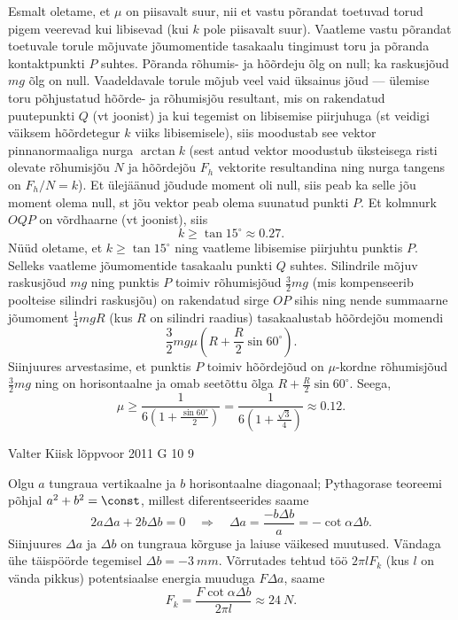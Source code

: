 \documentclass[11pt, twoside]{article}
\begin{document}
{{Esmalt oletame, et $\mu$ on piisavalt suur, nii et vastu põrandat toetuvad torud pigem veerevad kui libisevad (kui $k$ pole piisavalt suur). Vaatleme vastu põrandat toetuvale torule mõjuvate jõumomentide tasakaalu tingimust toru ja põranda kontaktpunkti $P$ suhtes. Põranda rõhumis- ja hõõrdeju õlg on null; ka raskusjõud $mg$ õlg on null. Vaadeldavale torule mõjub veel vaid üksainus jõud --- ülemise toru põhjustatud hõõrde- ja rõhumisjõu resultant, mis on rakendatud puutepunkti $Q$ (vt joonist) ja kui tegemist on libisemise piirjuhuga (st veidigi väiksem hõõrdetegur $k$ viiks libisemisele), siis moodustab see vektor pinnanormaaliga nurga $\arctan k$ (sest antud vektor moodustub üksteisega risti olevate rõhumisjõu $N$ ja hõõrdejõu $F_h$ vektorite resultandina ning nurga tangens on $F_h/N=k$). Et ülejäänud jõudude moment oli null, siis peab ka selle jõu moment olema null,
st jõu vektor peab olema suunatud punkti $P$. Et kolmnurk $OQP$ on võrdhaarne (vt joonist),
siis
\[
k\ge \tan 15^\circ\approx \num{0,27}.
\]
Nüüd oletame, et $k \ge \tan 15^\circ$ ning vaatleme libisemise piirjuhtu punktis $P$. Selleks vaatleme jõumomentide tasakaalu punkti $Q$ suhtes.
Silindrile mõjuv raskusjõud $mg$ ning punktis $P$ toimiv rõhumisjõud $\frac 32 mg$ (mis kompenseerib poolteise silindri raskusjõu) on rakendatud sirge $OP$ sihis ning nende summaarne jõumoment $\frac 14mgR$ (kus $R$ on silindri raadius) tasakaalustab hõõrdejõu momendi 
\[
\frac 32 mg\mu (R+\frac R2\sin 60^\circ).
\]
Siinjuures arvestasime, et punktis $P$ toimiv hõõrdejõud on $\mu$-kordne rõhumisjõud $\frac 32 mg$ ning on horisontaalne ja omab seetõttu õlga $R+\frac R2\sin 60^\circ$. Seega,
\[
\mu \ge \frac{1}{6\left(1+\frac{\sin 60^\circ}{2}\right)}=\frac{1}{6\left(1+\frac{\sqrt 3}{4}\right)}\approx \num{0,12}.
\]
\fi
}

{Valter Kiisk} %
{lõppvoor} %
{2011} %
{G 10} %
{9} %
{

\ifSolution
\osa Olgu $a$ tungraua vertikaalne ja $b$ horisontaalne diagonaal; Pythagorase teoreemi
põhjal $a^2 + b^2 = \const$, millest diferentseerides saame
\[
2 a \Delta a+2 b \Delta b=0 \quad \Rightarrow \quad \Delta a=\frac{-b \Delta b}{a}=-\cot \alpha \Delta b.
\]
Siinjuures $\Delta a$ ja $\Delta b$ on tungraua kõrguse ja laiuse väikesed muutused. Vändaga ühe
täispöörde tegemisel $\Delta b = \SI{-3}{mm}$. Võrrutades tehtud töö $2\pi lF_k$ (kus $l$ on vända
pikkus) potentsiaalse energia muuduga $F\Delta a$, saame
\[
F_{k} =\frac{F \cot \alpha \Delta b}{2 \pi l} \approx \SI{24}{N}.
\]

}}
\end{document}
